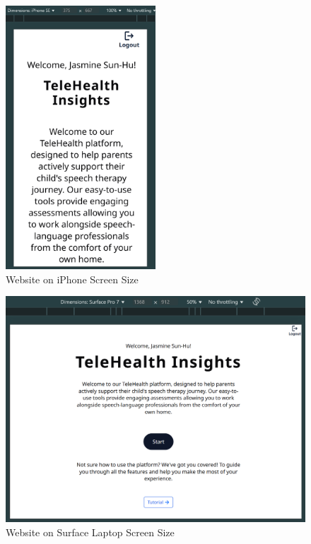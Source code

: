 \documentclass[12pt, titlepage]{article}
\begin{document}
\begin{figure}[p]
  \centering
  \includegraphics[width=0.5\textwidth]{images/TIscreensizeIphone.png}
  \caption{Website on iPhone Screen Size}
\end{figure}

\begin{figure}[p]
  \centering
  \includegraphics[width=1\textwidth]{images/TIscreensizeSurface.png}
  \caption{Website on Surface Laptop Screen Size}
\end{figure}

\clearpage
\end{document}
